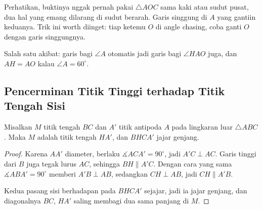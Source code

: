 \documentclass[letterpaper, 13pt]{scrartcl}
\newcommand{\titik}[1]{\foreach \p in {#1} \filldraw (\p) circle (1.4pt);}
\begin{document}
Perhatikan, buktinya nggak pernah pakai $\triangle AOC$ sama kaki atau sudut pusat, dua hal yang emang dilarang di sudut berarah. Garis singgung di $A$ yang gantiin keduanya. Trik ini worth diinget: tiap ketemu $O$ di angle chasing, coba ganti $O$ dengan garis singgungnya.

Salah satu akibat: garis bagi $\angle A$ otomatis jadi garis bagi $\angle HAO$ juga, dan $AH = AO$ kalau $\angle A = 60^\circ$.

\subsection{Pencerminan Titik Tinggi terhadap Titik Tengah Sisi}

\noindent
\begin{minipage}[t]{175pt}
\vspace{0pt}
\centering
{}
\end{minipage}\hfill
\begin{minipage}[t]{\dimexpr\textwidth-175pt-16pt\relax}
\vspace{0pt}
\begin{theorem*}
Misalkan $M$ titik tengah $BC$ dan $A'$ titik antipoda $A$ pada lingkaran luar $\triangle ABC$. Maka $M$ adalah titik tengah $HA'$, dan $BHCA'$ jajar genjang.
\end{theorem*}
\end{minipage}
\par\bigskip


\begin{proof}
Karena $AA'$ diameter, berlaku $\measuredangle ACA' = 90^\circ$, jadi $A'C \perp AC$. Garis tinggi dari $B$ juga tegak lurus $AC$, sehingga $BH \parallel A'C$. Dengan cara yang sama $\measuredangle ABA' = 90^\circ$ memberi $A'B \perp AB$, sedangkan $CH \perp AB$, jadi $CH \parallel A'B$.

Kedua pasang sisi berhadapan pada $BHCA'$ sejajar, jadi ia jajar genjang, dan diagonalnya $BC$, $HA'$ saling membagi dua sama panjang di $M$.
\end{proof}
\end{document}

